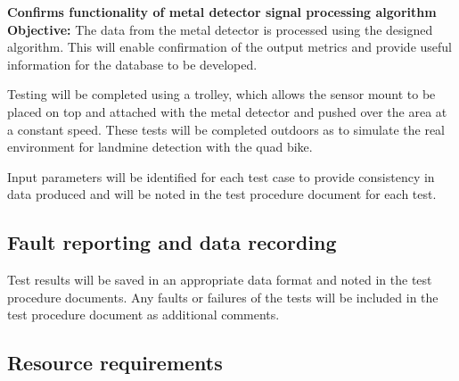 \documentclass[main.tex]{subfiles}
\begin{document}
\begin{appendices}
\begin{mds}
\end{mds}
\begin{mds}
\textbf{Confirms functionality of metal detector signal processing algorithm}\\
\textbf{Objective:} The data from the metal detector is processed using the designed algorithm. This will enable confirmation of the output metrics and provide useful information for the database to be developed. 

\end{mds}

\medskip\noindent
Testing will be completed using a trolley, which allows the sensor mount to be placed on top and attached with the metal detector and pushed over the area at a constant speed. These tests will be completed outdoors as to simulate the real environment for landmine detection with the quad bike. 

\medskip\noindent
Input parameters will be identified for each test case to provide consistency in data produced and will be noted in the test procedure document for each test. 

\subsection{Fault reporting and data recording}
Test results will be saved in an appropriate data format and noted in the test procedure documents. Any faults or failures of the tests will be included in the test procedure document as additional comments. 

\subsection{Resource requirements}


\end{appendices}
\end{document}
